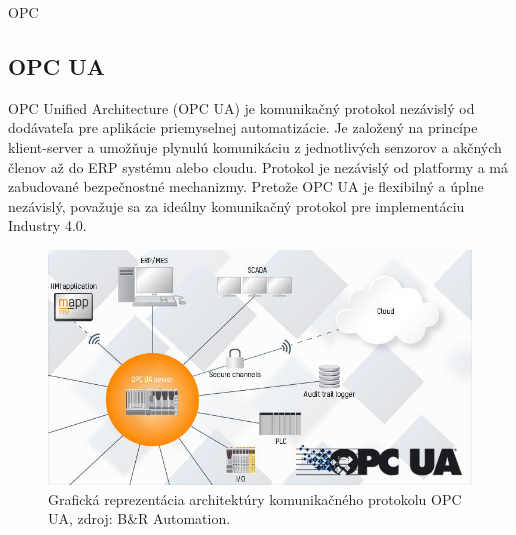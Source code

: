 \documentclass[]{tukediphc}
\begin{document}
OPC

\subsection{OPC UA}
 

OPC Unified Architecture (OPC UA) je komunikačný protokol nezávislý od dodávateľa pre aplikácie priemyselnej automatizácie. Je založený na princípe klient-server a umožňuje plynulú komunikáciu z jednotlivých senzorov a akčných členov až do ERP systému alebo cloudu. Protokol je nezávislý od platformy a má zabudované bezpečnostné mechanizmy. Pretože OPC UA je flexibilný a úplne nezávislý, považuje sa za ideálny komunikačný protokol pre implementáciu Industry 4.0.

\begin{figure}[h!]
	\centering
	\includegraphics[width=.9\textwidth,angle=0]{figures/opc-ua.jpg}
	\caption{Grafická reprezentácia architektúry komunikačného protokolu OPC UA, zdroj: B\&R Automation.}
\end{figure}

\end{document}

